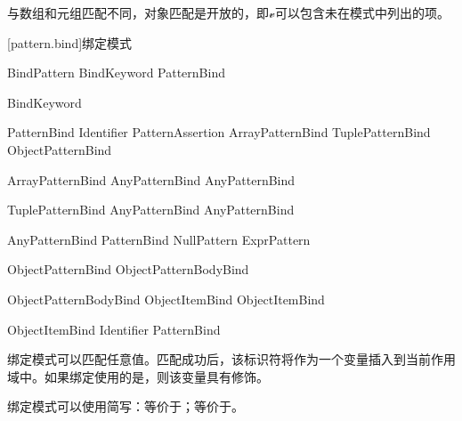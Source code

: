 \pnum
与数组和元组匹配不同，对象匹配是开放的，即$\mathcal{v}$可以包含未在模式中列出的项。

[pattern.bind]{绑定模式}

\begin{bnf}{BindPattern}
    BindKeyword PatternBind
\end{bnf}

\begin{bnf}{BindKeyword}
     \br
\end{bnf}

\begin{bnf}{PatternBind}
    Identifier PatternAssertion \br
    ArrayPatternBind \br
    TuplePatternBind \br
    ObjectPatternBind
\end{bnf}

\begin{bnf}{ArrayPatternBind}
    \terminal{[} AnyPatternBind \bnflp\terminal{,} AnyPatternBind\bnfrp\bnfs \terminal{]}
\end{bnf}

\begin{bnf}{TuplePatternBind}
    \terminal{(} AnyPatternBind \bnflp\terminal{,} AnyPatternBind\bnfrp\bnfs \terminal{)}
\end{bnf}

\begin{bnf}{AnyPatternBind}
    PatternBind \br
     \br
    NullPattern \br
    ExprPattern
\end{bnf}

\begin{bnf}{ObjectPatternBind}
    \terminal{\{} ObjectPatternBodyBind \terminal{\}}
\end{bnf}

\begin{bnf}{ObjectPatternBodyBind}
    ObjectItemBind \bnflp\terminal{,} ObjectItemBind\bnfrp\bnfs
\end{bnf}

\begin{bnf}{ObjectItemBind}
    Identifier \terminal{:} PatternBind
\end{bnf}

\pnum
绑定模式可以匹配任意值。匹配成功后，该标识符将作为一个变量插入到当前作用域中。如果绑定使用的是，则该变量具有修饰。

\pnum
绑定模式可以使用简写：等价于；等价于\tcode{[let i, _]}。

